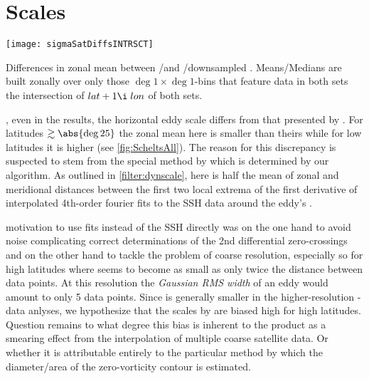 \section{Scales}
\begin{marginfigure}
	\texttt{[image: sigmaSatDiffsINTRSCT]}
	\caption{Differences in zonal mean \scale between \AVI/\POP and \AVI/downsampled \POP. Means/Medians are built zonally over only those $\deg{1}\times\deg{1}$-bins that feature data in both sets \ie the intersection of $lat+1\i \; lon$ of both sets. }
	\label{fig:sigmaSatDiffsINTRSCT}
\end{marginfigure}

, even in the \aviI results, the horizontal eddy scale \scale differs from that presented by \citet{Chelton2011}. For latitudes $\gtrsim\abs{\deg{25}}$ the zonal mean here is smaller than theirs while for low latitudes it is higher (see \cref{fig:ScheltsAll}). The reason for this discrepancy is suspected to stem from the special method by which \scale is determined by our algorithm.
As outlined in \cref{filter:dynscale}, here \scale is half the mean of zonal and meridional distances between the first two local extrema of the first derivative of interpolated 4th-order fourier fits to the SSH data around the eddy's \CoV.

 motivation to use fits instead of the SSH directly was on the one hand to avoid noise complicating correct determinations of the 2nd differential zero-crossings and on the other hand to tackle the problem of coarse resolution, especially so for high latitudes where \scale seems to become as small as only twice the distance between data points. At this resolution the \textit{Gaussian RMS width} of an eddy would amount to only 5 data points. Since \scale is generally smaller in the higher-resolution \POP-data anlyses, we hypothesize that the scales by \citeauthor{Chelton2011} are biased high for high latitudes. Question remains to what degree this bias is inherent to the \AVI product \ie as a smearing effect from the interpolation of multiple coarse satellite data. Or whether it is attributable entirely to the particular method by which the diameter/area of the zero-vorticity contour is estimated.

